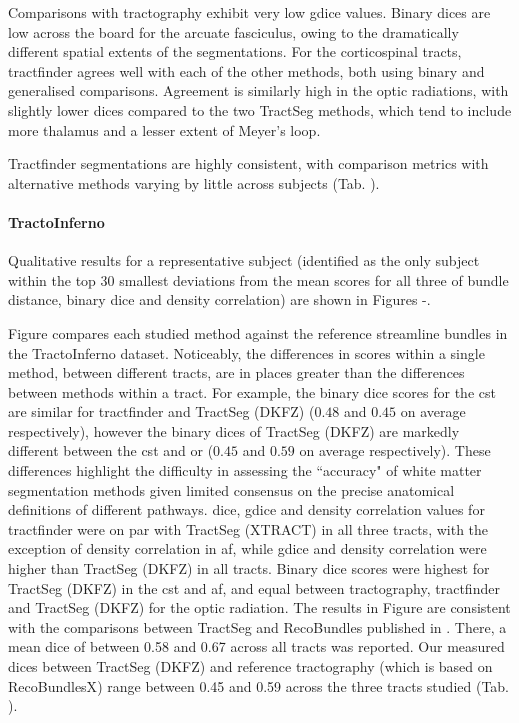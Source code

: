 Comparisons with tractography exhibit very low \gls{gdice} values.
Binary \gls{dice}s are low across the board for the arcuate fasciculus, owing to the dramatically different spatial extents of the segmentations.
For the corticospinal tracts, tractfinder agrees well with each of the other methods, both using binary and generalised comparisons.
Agreement is similarly high in the optic radiations, with slightly lower \gls{dice}s compared to the two TractSeg methods, which tend to include more thalamus and a lesser extent of Meyer's loop.

Tractfinder segmentations are highly consistent, with comparison metrics with alternative methods varying by little across subjects (Tab. ).

\paragraph*{TractoInferno}

Qualitative results for a representative subject (identified as the only subject within the top 30 smallest deviations from the mean scores for all three of bundle distance, binary \gls{dice} and density correlation) are shown in Figures -.

Figure  compares each studied method against the reference streamline bundles in the TractoInferno dataset.
Noticeably, the differences in scores within a single method, between different tracts, are in places greater than the differences between methods within a tract.
For example, the binary \gls{dice} scores for the \gls{cst} are similar for tractfinder and TractSeg (DKFZ) ($0.48$ and $0.45$ on average respectively), however the binary \gls{dice}s of TractSeg (DKFZ) are markedly different between the \gls{cst} and \gls{or} ($0.45$ and $0.59$ on average respectively).
These differences highlight the difficulty in assessing the ``accuracy" of white matter segmentation methods given limited consensus on the precise anatomical definitions of different pathways.
\gls{dice}, \gls{gdice} and density correlation values for tractfinder were on par with TractSeg (XTRACT) in all three tracts, with the exception of density correlation in \gls{af}, while \gls{gdice} and density correlation were higher than TractSeg (DKFZ) in all tracts.
Binary \gls{dice} scores were highest for TractSeg (DKFZ) in the \gls{cst} and \gls{af}, and equal between tractography, tractfinder and TractSeg (DKFZ)  for the optic radiation.
The results in Figure  are consistent with the comparisons between TractSeg and RecoBundles published in \textcite{Wasserthal2018}.
There, a mean \gls{dice} of between 0.58 and 0.67 across all tracts was reported.
Our measured \gls{dice}s between TractSeg (DKFZ) and reference tractography (which is based on RecoBundlesX\autocite{Garyfallidis2018}) range between 0.45 and 0.59 across the three tracts studied (Tab. ).

